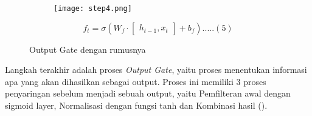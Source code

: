 \begin{subs}
	\begin{figure}[H]
		\centering
		\begin{subfigure}[b]{0.45\textwidth}
			\centering
			\texttt{[image: step4.png]}
		\end{subfigure}
		\hfill
		\begin{subfigure}[b]{0.5\textwidth}
			\centering
			\[
				f_t = \sigma \left( W_f \cdot \begin{bmatrix} h_{t-1},x_t \end{bmatrix} + b_f \right) ..... (5)
			\]
		\end{subfigure}
		\caption{Output Gate dengan rumusnya}
	\end{figure}
	Langkah terakhir adalah proses \textit{Output Gate}, yaitu proses menentukan informasi apa yang akan dihasilkan sebagai output. Proses ini memiliki 3 proses penyaringan sebelum menjadi sebuah output, yaitu Pemfilteran awal dengan sigmoid layer, Normalisasi dengan fungsi tanh dan Kombinasi hasil (\cite{Christopher}).

\end{subs}
